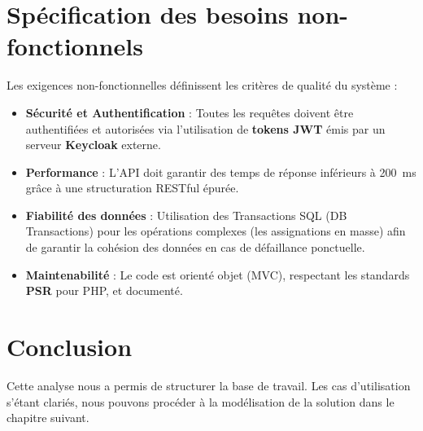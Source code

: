 \section{Sp\'{e}cification des besoins non-fonctionnels}

Les exigences non-fonctionnelles d\'{e}finissent les crit\`{e}res de qualit\'{e} du syst\`{e}me :

\begin{itemize}[leftmargin=*, label=\textcolor{emsiRed}{}]
    \item \textbf{S\'{e}curit\'{e} et Authentification} : Toutes les requ\^{e}tes doivent \^{e}tre
    authentifi\'{e}es et autoris\'{e}es via l'utilisation de \textbf{tokens JWT} \'{e}mis par un
    serveur \textbf{Keycloak} externe.
    \item \textbf{Performance} : L'API doit garantir des temps de r\'{e}ponse inf\'{e}rieurs
    \`{a} 200~ms gr\^{a}ce \`{a} une structuration RESTful \'{e}pur\'{e}e.
    \item \textbf{Fiabilit\'{e} des donn\'{e}es} : Utilisation des Transactions SQL (DB Transactions)
    pour les op\'{e}rations complexes (les assignations en masse) afin de garantir la
    coh\'{e}sion des donn\'{e}es en cas de d\'{e}faillance ponctuelle.
    \item \textbf{Maintenabilit\'{e}} : Le code est orient\'{e} objet (MVC), respectant les
    standards \textbf{PSR} pour PHP, et document\'{e}.
\end{itemize}

\section{Conclusion}
Cette analyse nous a permis de structurer la base de travail. Les cas
d'utilisation s'\'{e}tant clari\'{e}s, nous pouvons proc\'{e}der \`{a} la mod\'{e}lisation
de la solution dans le chapitre suivant.
